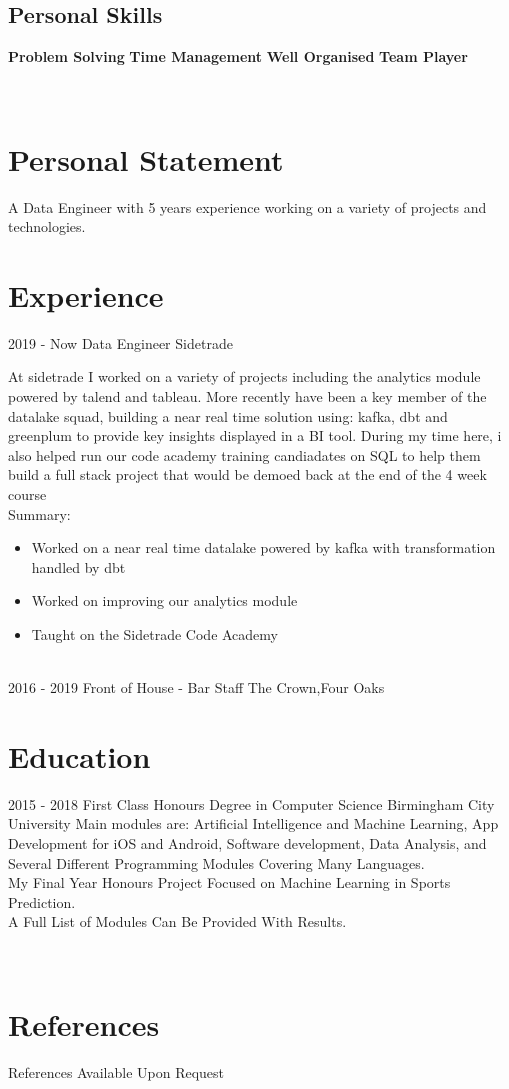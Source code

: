 \documentclass[]{friggeri-cv}
\begin{document}
\begin{aside}
  \section{Personal Skills}
    \textbf{Problem Solving}
    \textbf{Time Management}
    \textbf{Well Organised}
    \textbf{Team Player}    
    ~
\end{aside}
~
\section{Personal Statement}
A Data Engineer with 5 years experience working on a variety of projects and technologies.  

\section{Experience}
\begin{entrylist}
  \entry
  {2019 - Now}
  {Data Engineer}
  {Sidetrade}
  { At sidetrade I worked on a variety of projects including the analytics module powered by talend and tableau. 
  More recently have been a key member of the datalake squad, building a near real time solution using: kafka, dbt and greenplum to provide key insights displayed in a BI tool. 
  During my time here, i also helped run our code academy training candiadates on SQL to help them build a full stack project that would be demoed back at the end of the 4 week course
  \\Summary:  
  \begin{itemize}
    \item Worked on a near real time datalake powered by kafka with transformation handled by dbt 
    \item Worked on improving our analytics module 
    \item Taught on the Sidetrade Code Academy 
  \end{itemize}}
  \\
  \entry
  {2016 - 2019}
  {Front of House - Bar Staff}
  {The Crown,Four Oaks}

\end{entrylist}

\section{Education}

\begin{entrylist}
  \entry
    {2015 - 2018}
    {First Class Honours Degree in Computer Science}
    {Birmingham City University}
    {Main modules are: Artificial Intelligence and Machine Learning, App Development for iOS and Android, Software development, Data Analysis, and Several Different Programming Modules Covering Many Languages.
    \\ My Final Year Honours Project Focused on Machine Learning in Sports Prediction. 
    \\ A Full List of Modules Can Be Provided With Results.\\}
\end{entrylist}
\\

\section{References}
References Available Upon Request
\\
\end{document}
